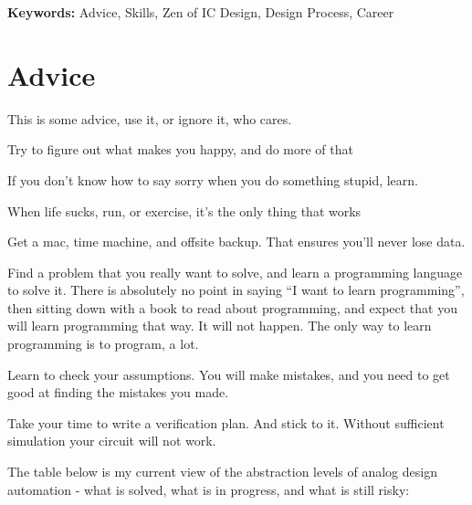 \textbf{Keywords:} Advice, Skills, Zen of IC Design, Design Process,
Career

\section{Advice}\label{advice}

This is some advice, use it, or ignore it, who cares.

Try to figure out what makes you happy, and do more of that

If you don't know how to say sorry when you do something stupid, learn.

When life sucks, run, or exercise, it's the only thing that works

Get a mac, time machine, and offsite backup. That ensures you'll never
lose data.

Find a problem that you really want to solve, and learn a programming
language to solve it. There is absolutely no point in saying ``I want to
learn programming'', then sitting down with a book to read about
programming, and expect that you will learn programming that way. It
will not happen. The only way to learn programming is to program, a lot.

Learn to check your assumptions. You will make mistakes, and you need to
get good at finding the mistakes you made.

Take your time to write a verification plan. And stick to it. Without
sufficient simulation your circuit will not work.

The table below is my current view of the abstraction levels of analog
design automation - what is solved, what is in progress, and what is
still risky:

